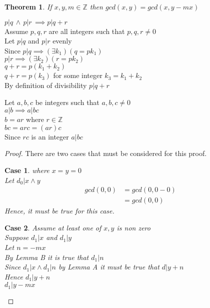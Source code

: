 \documentclass[11pt,a4paper]{book}
\theoremstyle{plain}
\newtheorem{thm}{Theorem}
\newenvironment{lemma}[2][Lemma]{\begin{trivlist}
\item[\hskip \labelsep {\bfseries #1}\hskip \labelsep {\bfseries #2.}]}{\end{trivlist}}
\newtheorem{case}{Case}
\theoremstyle{nonumberplain}
\newtheorem{proof}{Proof}
\begin{document}
\begin{thm}
If $x,y,m \in \mathbb{Z}$ then $gcd(x,y) = gcd(x,y-mx)$
\end{thm}
\begin{lemma}{A}$p|q \, \wedge \, p|r \, \implies p|q+r$\\
	Assume $p,q,r$ are all integers such that $p,q,r \neq 0$\\
	Let $p|q$ and $p|r$ evenly\\
	Since $p|q \implies (\exists k_1)(q=pk_1)$\\
	$p|r \implies (\exists k_2)(r=pk_2)$\\
	$ q+r = p(k_1+k_2)$\\
	$q+r=p(k_3)$ for some integer $k_3=k_1+k_2$\\
	By definition of divisibility $p|q+r$\\
\end{lemma}
\begin{lemma}{B}
	Let $a,b,c$ be integers such that $a,b,c \neq 0$\\
	$a|b \implies a|bc$\\
	$b=ar$ where $r \in \mathbb{Z}$\\
	$bc=arc=(ar)c$\\
	Since $rc$ is an integer $a|bc$
\end{lemma}
\begin{proof}
There are two cases that must be considered for this proof.
\begin{case}
where $x=y=0$\\
Let $d_0 | x \wedge y$ 
\begin{align*}
gcd(0,0) &= gcd(0,0-0)\\
&= gcd(0,0)
\end{align*}
Hence, it must be true for this case.
\end{case}
\begin{case}
Assume at least one of $x,y$ is non zero\\
Suppose $d_1|x$ and $d_1|y$\\
Let $n = -mx$\\
By Lemma B it is true that $d_1|n$\\
Since $d_1|x \wedge d_1|n$ by Lemma A it must be true that $d|y+n$\\
Hence $d_1 | y+n$\\
$d_1|y-mx$ 
\end{case}
\end{proof}
\end{document}
